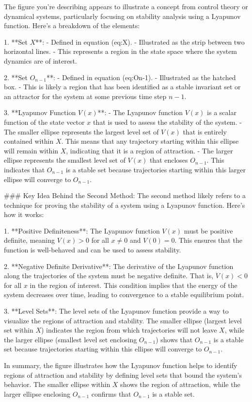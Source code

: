 The figure you're describing appears to illustrate a concept from control theory or dynamical systems, particularly focusing on stability analysis using a Lyapunov function. Here's a breakdown of the elements:

1. **Set \(X\)**:
   - Defined in equation (eq:X).
   - Illustrated as the strip between two horizontal lines.
   - This represents a region in the state space where the system dynamics are of interest.

2. **Set \(O_{n-1}\)**:
   - Defined in equation (eq:On-1).
   - Illustrated as the hatched box.
   - This is likely a region that has been identified as a stable invariant set or an attractor for the system at some previous time step \(n-1\).

3. **Lyapunov Function \(V(x)\)**:
   - The Lyapunov function \(V(x)\) is a scalar function of the state vector \(x\) that is used to assess the stability of the system.
   - The smaller ellipse represents the largest level set of \(V(x)\) that is entirely contained within \(X\). This means that any trajectory starting within this ellipse will remain within \(X\), indicating that it is a region of attraction.
   - The larger ellipse represents the smallest level set of \(V(x)\) that encloses \(O_{n-1}\). This indicates that \(O_{n-1}\) is a stable set because trajectories starting within this larger ellipse will converge to \(O_{n-1}\).

### Key Idea Behind the Second Method:
The second method likely refers to a technique for proving the stability of a system using a Lyapunov function. Here’s how it works:

1. **Positive Definiteness**: The Lyapunov function \(V(x)\) must be positive definite, meaning \(V(x) > 0\) for all \(x \neq 0\) and \(V(0) = 0\). This ensures that the function is well-behaved and can be used to assess stability.

2. **Negative Definite Derivative**: The derivative of the Lyapunov function along the trajectories of the system must be negative definite. That is, \(\dot{V}(x) < 0\) for all \(x\) in the region of interest. This condition implies that the energy of the system decreases over time, leading to convergence to a stable equilibrium point.

3. **Level Sets**: The level sets of the Lyapunov function provide a way to visualize the regions of attraction and stability. The smaller ellipse (largest level set within \(X\)) indicates the region from which trajectories will not leave \(X\), while the larger ellipse (smallest level set enclosing \(O_{n-1}\)) shows that \(O_{n-1}\) is a stable set because trajectories starting within this ellipse will converge to \(O_{n-1}\).

In summary, the figure illustrates how the Lyapunov function helps to identify regions of attraction and stability by defining level sets that bound the system's behavior. The smaller ellipse within \(X\) shows the region of attraction, while the larger ellipse enclosing \(O_{n-1}\) confirms that \(O_{n-1}\) is a stable set.